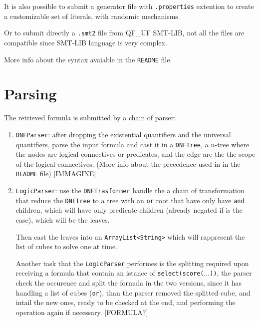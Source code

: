 \documentclass[11pt,a4paper]{article}
\begin{document}
    It is also possible to submit a generator file with \texttt{.properties} extention
    to create a customizable set of literals, with randomic mechanisms.

    Or to submit directly a \texttt{.smt2} file from QF\_UF SMT-LIB, not all the files 
    are compatible since SMT-LIB language is very complex.
    
    More info about the syntax avaiable in the \texttt{README} file.

    \section{Parsing}

    The retrieved formula is submitted by a chain of parser:
    \begin{enumerate}
        \item \texttt{DNFParser}: after dropping the existential quantifiers and the universal 
        quantifiers,
        parse the input formula and cast it in a \texttt{DNFTree},
        a $n$-tree where the nodes are logical connectives or predicates, and the edge are the 
        the scope of the logical connectives. 
        (More info about the precedence used in in the \texttt{README} file)
        [IMMAGINE]
        \item \texttt{LogicParser}: use the \texttt{DNFTrasformer} handle the a chain of 
        transformation that reduce the \texttt{DNFTree} to a tree with an \texttt{or} root
        that have only have \texttt{and} children, which will have only predicate children
        (already negated if is the case), which will be the leaves.

        Then cast the leaves into an \texttt{ArrayList<String>} which will rappresent the 
        list of cubes to solve one at time.

        Another task that the \texttt{LogicParser} performes is the splitting required upon 
        receiving a formula that contain an istance of \texttt{select(score($\dots$))},
        the parser check the occurence and split the formula in the two versions,
        since it has handling a list of cubes (\texttt{or}), 
        than the parser removed the splitted cube, and intail the new ones, 
        ready to be checked at the end, and performing the operation again if necessary.
        [FORMULA?]
    \end{enumerate}
\end{document}
